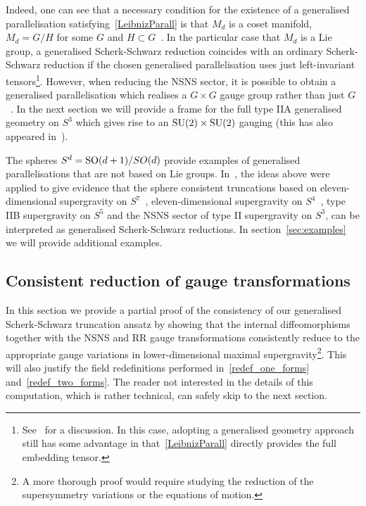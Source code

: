 \documentclass[debug]{phd}
\begin{document}
			Indeed, one can see that a necessary condition for the existence of a generalised parallelisation satisfying~\eqref{LeibnizParall} is that $M_d$ is a coset manifold, $M_d = G/H$ for some $G$ and $H\subset G$~\cite{spheres, petrini3}.
			In the particular case that $M_d$ is a Lie group, a generalised Scherk-Schwarz reduction coincides with an ordinary Scherk-Schwarz reduction if the chosen generalised parallelisation uses just left-invariant tensors\footnote{%
				See~\cite[app. C]{spheres} for a discussion.
				In this case, adopting a generalised geometry approach still has some advantage in that~\eqref{LeibnizParall} directly provides the full embedding tensor.}.
			However, when reducing the NSNS sector, it is possible to obtain a generalised parallelisation which realises a $G\times G$ gauge group rather than just $G$~\cite{Baguet:2015iou}. 
			In the next section we will provide a frame for the full type IIA generalised geometry on $S^3$ which gives rise to an $\mathrm{SU}(2)\times\mathrm{SU}(2)$ gauging (this has also appeared in~\cite{Malek:2015hma}).
			
			The spheres $S^d = \mathrm{SO}(d+1)/SO(d)$ provide examples of generalised parallelisations that are not based on Lie groups.
			In~\cite{spheres}, the ideas above were applied to give evidence that the sphere consistent truncations based on eleven-dimensional supergravity on $S^7$~\cite{deWit:1986oxb}, eleven-dimensional supergravity on $S^4$~\cite{Nastase:1999kf}, type IIB supergravity on $S^5$ and the NSNS sector of type II supergravity on $S^3$, can be interpreted as generalised Scherk-Schwarz reductions. 
			In section~\ref{sec:examples} we will provide additional examples.
			\subsection{Consistent reduction of gauge transformations}
					In this section we provide a partial proof of the consistency of our generalised Scherk-Schwarz truncation ansatz by showing that the internal diffeomorphisms together with the NSNS and RR gauge transformations consistently reduce to the appropriate gauge variations in lower-dimensional maximal supergravity\footnote{%
						A more thorough proof would require studying the reduction of the supersymmetry variations or the equations of motion.}.
					This will also justify the field redefinitions performed in~\eqref{redef_one_forms} and~\eqref{redef_two_forms}. 
					The reader not interested in the details of this computation, which is rather technical, can safely skip to the next section.
					
\end{document}
